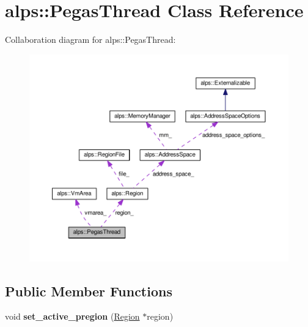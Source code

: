 \hypertarget{classalps_1_1PegasThread}{}\section{alps\+:\+:Pegas\+Thread Class Reference}
\label{classalps_1_1PegasThread}


Collaboration diagram for alps\+:\+:Pegas\+Thread\+:
\nopagebreak
\begin{figure}[H]
\begin{center}
\leavevmode
\includegraphics[width=350pt]{classalps_1_1PegasThread__coll__graph}
\end{center}
\end{figure}
\subsection*{Public Member Functions}
\begin{DoxyCompactItemize}
\item 
void {\bfseries set\+\_\+active\+\_\+pregion} (\hyperlink{classalps_1_1Region}{Region} $\ast$region)\hypertarget{classalps_1_1PegasThread_a9dda39658cc11f48d4eb4d7e8528866a}{}\label{classalps_1_1PegasThread_a9dda39658cc11f48d4eb4d7e8528866a}

\end{DoxyCompactItemize}
